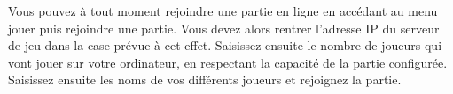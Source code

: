 
Vous pouvez à tout moment rejoindre une partie en ligne en accédant au menu jouer puis rejoindre une partie.
Vous devez alors rentrer l'adresse IP du serveur de jeu dans la case prévue à cet effet.
Saisissez ensuite le nombre de joueurs qui vont jouer sur votre ordinateur, en respectant la capacité de la partie configurée.
Saisissez ensuite les noms de vos différents joueurs et rejoignez la partie.
